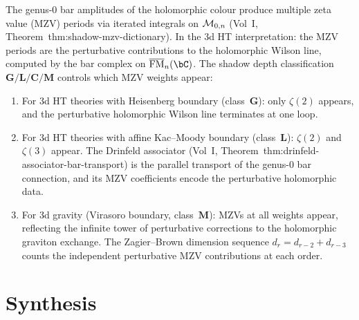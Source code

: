 \begin{remark}%
\label{rem:thqg-mzv-bar}%
%
%
The genus-$0$ bar amplitudes of the holomorphic colour
produce multiple zeta value (MZV) periods via iterated
integrals on $\mathcal{M}_{0,n}$
\textup{(}Vol~I, Theorem~\textup{thm:shadow-mzv-dictionary}\textup{)}.
In the 3d HT interpretation: the MZV periods are the
perturbative contributions to the holomorphic Wilson line,
computed by the bar complex on $\overline{\mathrm{FM}}_n(\bC)$.
The shadow depth classification $\mathbf{G}/\mathbf{L}/\mathbf{C}/\mathbf{M}$
controls which MZV weights appear:
\begin{enumerate}[label=\textup{(\roman*)}]
\item For 3d HT theories with Heisenberg boundary
\textup{(}class~$\mathbf{G}$\textup{)}: only $\zeta(2)$
appears, and the perturbative holomorphic Wilson line
terminates at one loop.
\item For 3d HT theories with affine Kac--Moody boundary
\textup{(}class~$\mathbf{L}$\textup{)}: $\zeta(2)$ and
$\zeta(3)$ appear. The Drinfeld associator
\textup{(}Vol~I,
Theorem~\textup{thm:drinfeld-associator-bar-transport}\textup{)}
is the parallel transport of the genus-$0$ bar
connection, and its MZV coefficients encode the
perturbative holomorphic data.
\item For 3d gravity \textup{(}Virasoro boundary,
class~$\mathbf{M}$\textup{)}: MZVs at all weights
appear, reflecting the infinite tower of perturbative
corrections to the holomorphic graviton exchange.
The Zagier--Brown dimension sequence
$d_r = d_{r-2} + d_{r-3}$ counts the independent
perturbative MZV contributions at each order.
\end{enumerate}
\end{remark}

\section{Synthesis}
\label{sec:fredholm-pf-supplement}

